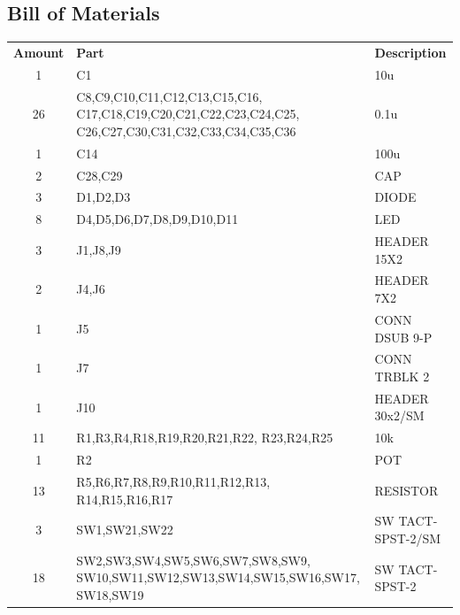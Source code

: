 \begin{appendices}
        \clearpage
        \newpage

    \section{Bill of Materials} \label{appendix:bom}

        \def\arraystretch{1.22}
        \begin{table}[H]
            \footnotesize
            \begin{tabular*}{100pt}{@{\extracolsep{\fill}} c p{10cm} p{10cm}}
                \textbf{Amount} & \textbf{Part} & \textbf{Description} \\
                1 & C1 & 10u \\
                26 & C8,C9,C10,C11,C12,C13,C15,C16,\newline
                C17,C18,C19,C20,C21,C22,C23,C24,C25,\newline 
                C26,C27,C30,C31,C32,C33,C34,C35,C36 & 0.1u \\
                1 & C14 & 100u \\
                2 & C28,C29 & CAP \\
                3 & D1,D2,D3 & DIODE \\
                8 & D4,D5,D6,D7,D8,D9,D10,D11 & LED \\
                3 & J1,J8,J9 & HEADER 15X2 \\
                2 & J4,J6 & HEADER 7X2 \\
                1 & J5 & CONN DSUB 9-P \\
                1 & J7 & CONN TRBLK 2 \\
                1 & J10 & HEADER 30x2/SM \\
                11 & R1,R3,R4,R18,R19,R20,R21,R22,\newline
                R23,R24,R25 & 10k \\
                1 & R2 & POT \\
                13 & R5,R6,R7,R8,R9,R10,R11,R12,R13,\newline
                R14,R15,R16,R17 & RESISTOR \\
                3 & SW1,SW21,SW22 & SW TACT-SPST-2/SM \\
                18 & SW2,SW3,SW4,SW5,SW6,SW7,SW8,SW9,\newline
                SW10,SW11,SW12,SW13,SW14,SW15,SW16,SW17,\newline
                SW18,SW19 & SW TACT-SPST-2 \\

\end{tabular*}
\end{table}
\end{appendices}
